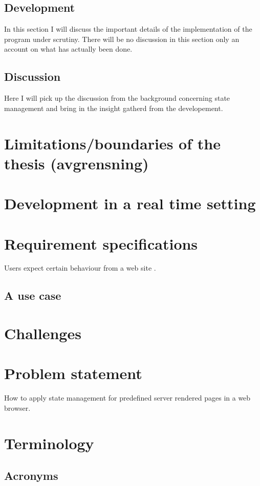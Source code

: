 \documentclass[english]{ifimaster}
\begin{document}
\subsection{Development}
In this section I will discuss the important details of the implementation of the program under scrutiny. There will be no discussion in this section only an account on what has actually been done.

\subsection{Discussion}
Here I will pick up the discussion from the background concerning state management and bring in the insight gatherd from the developement.
\section{Limitations/boundaries of the thesis (avgrensning)}

\section{Development in a real time setting}




\section{Requirement specifications}
Users expect certain behaviour from a web site \parencite{mikowski}.
\subsection{A use case}




\section{Challenges}

\section{Problem statement}
How to apply state management for predefined server rendered pages in a web browser.

\section{Terminology}
\subsection{Acronyms}
\end{document}
